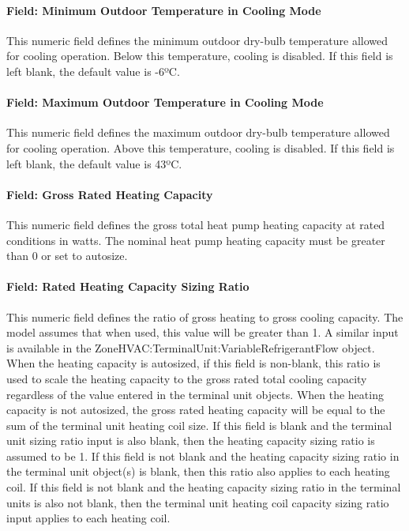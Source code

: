 \paragraph{Field: Minimum Outdoor Temperature in Cooling Mode}\label{field-minimum-outdoor-temperature-in-cooling-mode}

This numeric field defines the minimum outdoor dry-bulb temperature allowed for cooling operation. Below this temperature, cooling is disabled. If this field is left blank, the default value is -6ºC.

\paragraph{Field: Maximum Outdoor Temperature in Cooling Mode}\label{field-maximum-outdoor-temperature-in-cooling-mode}

This numeric field defines the maximum outdoor dry-bulb temperature allowed for cooling operation. Above this temperature, cooling is disabled. If this field is left blank, the default value is 43ºC.

\paragraph{Field: Gross Rated Heating Capacity}\label{field-gross-rated-heating-capacity-000}

This numeric field defines the gross total heat pump heating capacity at rated conditions in watts. The nominal heat pump heating capacity must be greater than 0 or set to autosize.

\paragraph{Field: Rated Heating Capacity Sizing Ratio}\label{field-rated-heating-capacity-sizing-ratio}

This numeric field defines the ratio of gross heating to gross cooling capacity. The model assumes that when used, this value will be greater than 1. A similar input is available in the ZoneHVAC:TerminalUnit:VariableRefrigerantFlow object. When the heating capacity is autosized, if this field is non-blank, this ratio is used to scale the heating capacity to the gross rated total cooling capacity regardless of the value entered in the terminal unit objects. When the heating capacity is not autosized, the gross rated heating capacity will be equal to the sum of the terminal unit heating coil size. If this field is blank and the terminal unit sizing ratio input is also blank, then the heating capacity sizing ratio is assumed to be 1. If this field is not blank and the heating capacity sizing ratio in the terminal unit object(s) is blank, then this ratio also applies to each heating coil. If this field is not blank and the heating capacity sizing ratio in the terminal units is also not blank, then the terminal unit heating coil capacity sizing ratio input applies to each heating coil.

